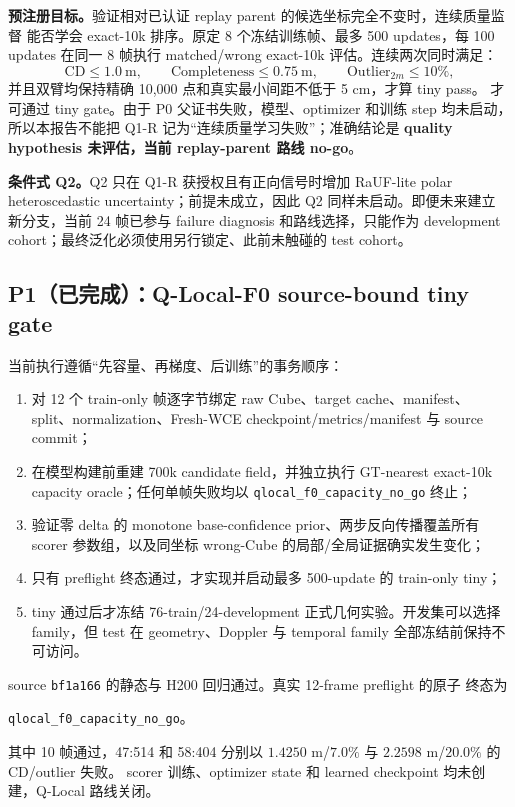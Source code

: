 \documentclass[11pt,a4paper,fontset=none]{ctexart}
\newcommand{\code}[1]{\texttt{#1}}
\begin{document}
\textbf{预注册目标。}验证相对已认证 replay parent 的候选坐标完全不变时，连续质量监督
能否学会 exact-10k 排序。原定 8 个冻结训练帧、最多 500 updates，每 100 updates
在同一 8 帧执行 matched/wrong exact-10k 评估。连续两次同时满足：
\begin{equation}
  \mathrm{CD}\le1.0\ \mathrm m,\qquad
  \mathrm{Completeness}\le0.75\ \mathrm m,\qquad
  \mathrm{Outlier}_{2m}\le10\%,
\end{equation}
并且双臂均保持精确 10,000 点和真实最小间距不低于 5 cm，才算 tiny pass。
才可通过 tiny gate。由于 P0 父证书失败，模型、optimizer 和训练 step 均未启动，
所以本报告不能把 Q1-R 记为“连续质量学习失败”；准确结论是
\textbf{quality hypothesis 未评估，当前 replay-parent 路线 no-go}。

\textbf{条件式 Q2。}Q2 只在 Q1-R 获授权且有正向信号时增加 RaUF-lite polar
heteroscedastic uncertainty；前提未成立，因此 Q2 同样未启动。即便未来建立
新分支，当前 24 帧已参与 failure diagnosis 和路线选择，只能作为 development
cohort；最终泛化必须使用另行锁定、此前未触碰的 test cohort。

\subsection{P1（已完成）：Q-Local-F0 source-bound tiny gate}

当前执行遵循“先容量、再梯度、后训练”的事务顺序：
\begin{enumerate}
  \item 对 12 个 train-only 帧逐字节绑定 raw Cube、target cache、manifest、
  split、normalization、Fresh-WCE checkpoint/metrics/manifest 与 source commit；
  \item 在模型构建前重建 700k candidate field，并独立执行 GT-nearest exact-10k
  capacity oracle；任何单帧失败均以 \code{qlocal\_f0\_capacity\_no\_go} 终止；
  \item 验证零 delta 的 monotone base-confidence prior、两步反向传播覆盖所有
  scorer 参数组，以及同坐标 wrong-Cube 的局部/全局证据确实发生变化；
  \item 只有 preflight 终态通过，才实现并启动最多 500-update 的 train-only tiny；
  \item tiny 通过后才冻结 76-train/24-development 正式几何实验。开发集可以选择
  family，但 test 在 geometry、Doppler 与 temporal family 全部冻结前保持不可访问。
\end{enumerate}

source \code{bf1a166} 的静态与 H200 回归通过。真实 12-frame preflight 的原子
终态为
\begin{center}
  \code{qlocal\_f0\_capacity\_no\_go}。
\end{center}
其中 10 帧通过，47:514 和 58:404
分别以 $1.4250$ m/$7.0\%$ 与 $2.2598$ m/$20.0\%$ 的 CD/outlier 失败。
scorer 训练、optimizer state 和 learned checkpoint 均未创建，Q-Local 路线关闭。
\end{document}
